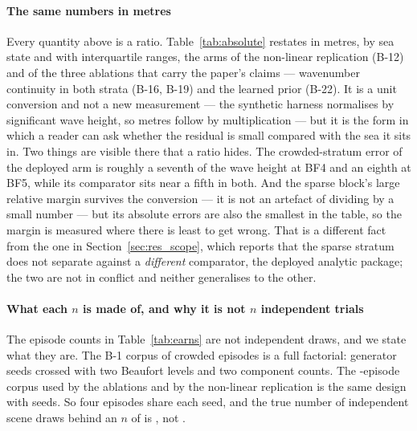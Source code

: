 \documentclass[review]{elsarticle}
\begin{document}
\paragraph{The same numbers in metres}
Every quantity above is a ratio. Table~\ref{tab:absolute} restates in metres, by sea
state and with interquartile ranges, the arms of the non-linear replication (B-12)
and of the three ablations that carry the paper's claims --- wavenumber continuity in
both strata (B-16, B-19) and the learned prior (B-22).
It is a
unit conversion and not a new measurement --- the synthetic harness normalises by
significant wave height, so metres follow by multiplication --- but it is the form
in which a reader can ask whether the residual is small compared with the sea it
sits in. Two things are visible there that a ratio hides. The crowded-stratum error
of the deployed arm is roughly a seventh of the wave height at BF4 and an eighth at
BF5, while its comparator sits near a fifth in both. And the sparse block's large
relative margin survives the conversion --- it is not an artefact of dividing by a
small number --- but its absolute errors are also the smallest in the table, so the
margin is measured where there is least to get wrong. That is a different fact from
the one in Section~\ref{sec:res_scope}, which reports that the sparse stratum does
not separate against a \emph{different} comparator, the deployed analytic package;
the two are not in conflict and neither generalises to the other.



\paragraph{What each $n$ is made of, and why it is not $n$ independent trials}
The episode counts in Table~\ref{tab:earns} are not independent draws, and we state
what they are. The B-1 corpus of \HeadlineEps{} crowded episodes is a full
factorial: \HeadlineSeeds{} generator seeds crossed with two Beaufort levels and two
component counts. The \AblationEps{}-episode corpus used by the ablations and by the
non-linear replication is the same design with \AblationSeeds{} seeds. So four
episodes share each seed, and the true number of independent scene draws behind an
$n$ of \AblationEps{} is \AblationSeeds{}, not \AblationEps{}.
\end{document}
